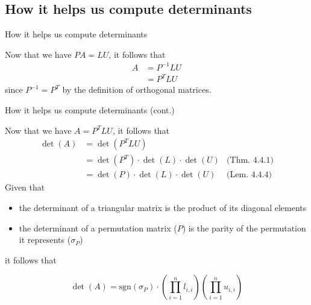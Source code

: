 \documentclass{beamer}
\begin{document}





\subsection{How it helps us compute determinants}

\begin{frame}{How it helps us compute determinants}

    Now that we have $PA = LU$, it follows that
    \begin{align*}
        A &= P^{-1}LU \\
          &= P^T LU
    \end{align*}
    since $P^{-1} = P^T$ by the definition of orthogonal matrices.

\end{frame}

\begin{frame}{How it helps us compute determinants (cont.)}

    Now that we have $A=P^T LU$, it follows that
    \begin{align*}
        \det(A)  & = \det(P^T L U) & \\
                 & = \det(P^T)\cdot \det(L)\cdot \det(U) & \text{(Thm. 4.4.1)} \\
                 & = \det(P)\cdot \det(L)\cdot \det(U)   & \text{(Lem. 4.4.4)}
    \end{align*}
    Given that
    \begin{itemize}
        \item the determinant of a triangular matrix is the product of its diagonal elements
        \item the determinant of a permutation matrix ($P$) is the parity of the permutation
            it represents ($\sigma_P$)
    \end{itemize}
    it follows that
    \begin{block}{}
        \[
            \det(A) = \text{sgn}(\sigma_P) \cdot \left( \prod_{i=1}^{n} l_{i,i} \right)
            \left( \prod_{i=1}^{n} u_{i,i} \right)
        \]
    \end{block}


\end{frame}
\end{document}
